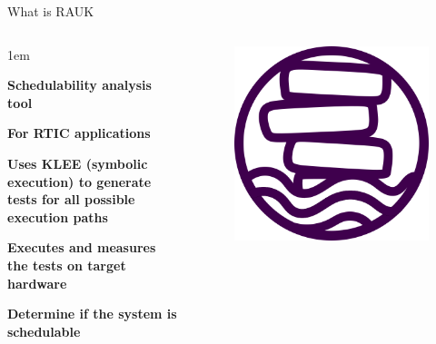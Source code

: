 \begin{frame}{What is RAUK}
    \begin{columns}
        \begin{itemize-size}{1em}
            \item \textbf{Schedulability analysis tool}
            \item \textbf{For RTIC applications}
            \item \textbf{Uses KLEE (symbolic execution) to generate tests for
                all possible execution paths}
            \item \textbf{Executes and measures the tests on target hardware}
            \item \textbf{Determine if the system is schedulable}
        \end{itemize-size}

        \begin{figure}
            \centering
            \includegraphics[scale=0.25]{pictures/RAUK.png}
        \end{figure}
    \end{columns}
\end{frame}
